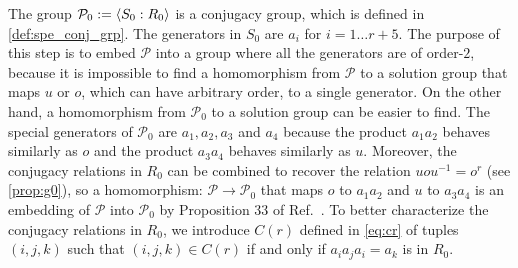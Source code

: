 \documentclass[11pt,letterpaper]{article}
\DeclarePairedDelimiter{\ip}{\langle}{\rangle}
\newcommand{\1}{\mathbb{1}}
\newcommand{\Pg}{\mathcal{P}}
\theoremstyle{definition}
\begin{document}
The group $\Pg_0 := \ip{S_0:R_0}$ is a 
conjugacy group, which is defined in \cref{def:spe_conj_grp}. 
The generators in $S_0$ are $a_i$ for $i=1 \dots r+5$.
The purpose of this step is to embed $\Pg$ into a group where all the
generators are of order-$2$, because
it is impossible to find a homomorphism from $\Pg$ to a solution group that maps $u$ or $o$, which can have arbitrary order, to a single generator. On the other hand, 
a homomorphism from $\Pg_0$ to a solution group can be easier to find.
The special generators of $\Pg_0$ are $a_1, a_2, a_3$ and $a_4$ because the product $a_1a_2$ behaves similarly as $o$
and the product $a_3a_4$ behaves similarly as $u$.
Moreover, the conjugacy relations in $R_0$ can be combined to recover the relation $uou^{-1} = o^r$ (see \cref{prop:g0}), so
a homomorphism: $\Pg \rightarrow\Pg_0$  that maps $o$ to $a_1a_2$ and $u$ to $a_3a_4$ is an embedding of $\Pg$ into $\Pg_0$
by Proposition $33$ of Ref.~\cite{slofstra2017}.
To better characterize the conjugacy relations in $R_0$, we introduce $C(r)$ defined in \cref{eq:cr}
of tuples $(i,j,k)$ such that $(i,j,k) \in C(r)$ if and only if $a_ia_ja_i = a_k$ is in $R_0$. 
\end{document}
